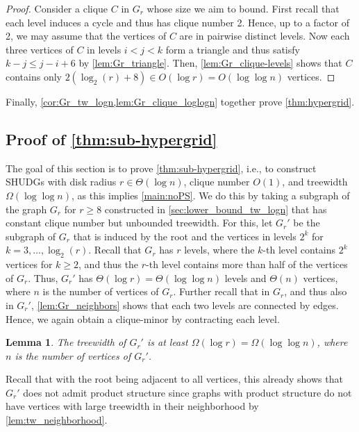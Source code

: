 \documentclass[11pt]{article}
\newtheorem{lemma}[theorem]{Lemma}
\providecommand{\todo}[2][]{}
\begin{document}
%
\begin{proof}
    Consider a clique $ C $ in $ G_r $ whose size we aim to bound.
    First recall that each level induces a cycle and thus has clique number 2.
    Hence, up to a factor of 2, we may assume that the vertices of $ C $ are in pairwise distinct levels.
    Now each three vertices of $ C $ in levels $ i < j < k $ form a triangle and thus satisfy $ k - j \leq j - i + 6 $ by \cref{lem:Gr_triangle}.
    Then, \cref{lem:Gr_clique-levels} shows that $ C $ contains only $ 2 (\log_2(r) + 8) \in O(\log r) = O(\log \log n) $ vertices. 
\end{proof}
%
Finally, \cref{cor:Gr_tw_logn,lem:Gr_clique_loglogn} together prove \cref{thm:hypergrid}.
%
%
%
\subsection{Proof of \texorpdfstring{\cref{thm:sub-hypergrid}}{Theorem 9}}
\label{sec:lower_bound_tw_loglogn}
\todo{adjust theorem number in texorpdfstring}
%
The goal of this section is to prove \cref{thm:sub-hypergrid}, i.e., to construct SHUDGs with disk radius $ r \in \Theta(\log n) $, clique number $ O(1) $, and treewidth $ \Omega(\log \log n) $, as this implies \cref{main:noPS}.
We do this by taking a subgraph of the graph $ G_r $ for $ r \geq 8 $ constructed in \cref{sec:lower_bound_tw_logn} that has constant clique number but unbounded treewidth.
For this, let $ G_r' $ be the subgraph of $ G_r $ that is induced by the root and the vertices in levels $ 2^k $ for $ k = 3, \dots, \log_2(r) $.
Recall that $ G_r $ has $ r $ levels, where the $ k $-th level contains $ 2^k $ vertices for $ k \geq 2 $, and thus the $ r $-th level contains more than half of the vertices of $ G_r $.
Thus, $ G_r' $ has $ \Theta(\log r) = \Theta( \log \log n ) $ levels and $ \Theta(n) $ vertices, where $ n $ is the number of vertices of $ G_r $.
Further recall that in $ G_r $, and thus also in $ G_r' $, \cref{lem:Gr_neighbors} shows that each two levels are connected by edges.
Hence, we again obtain a clique-minor by contracting each level.
%
\begin{lemma}\label{lem:Gr'_tw_loglogn}
    The treewidth of $ G_r' $ is at least $ \Omega(\log r) = \Omega(\log \log n) $, where $ n $ is the number of vertices of $ G_r' $.
\end{lemma}
%
Recall that with the root being adjacent to all vertices, this already shows that $ G_r' $ does not admit product structure since graphs with product structure do not have vertices with large treewidth in their neighborhood by \cref{lem:tw_neighborhood}.
\end{document}
